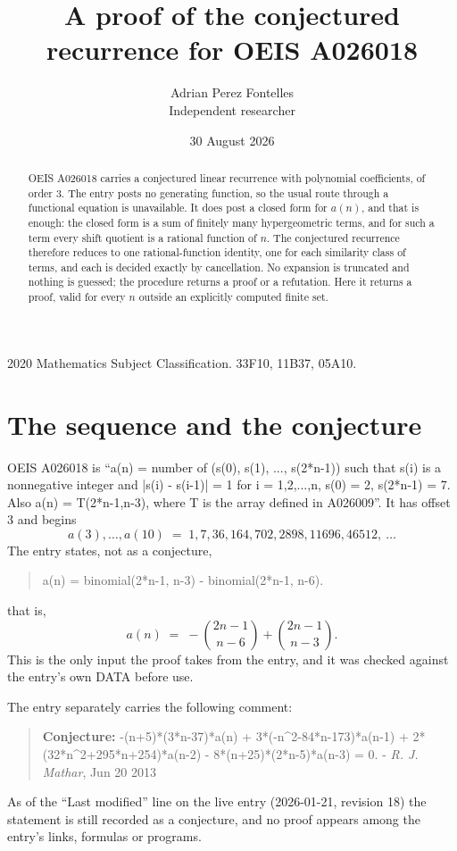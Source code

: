 \documentclass[11pt,a4paper]{article}
\title{A proof of the conjectured recurrence for OEIS A026018}
\author{Adrian Perez Fontelles\\ \small Independent researcher}
\date{30 August 2026}
\theoremstyle{plain}
\theoremstyle{definition}
\begin{document}
\maketitle

\begin{abstract}
OEIS A026018 carries a conjectured linear recurrence with polynomial coefficients, of
order 3. The entry posts no generating function, so the usual route through a
functional equation is unavailable. It does post a closed form for $a(n)$, and that is
enough: the closed form is a sum of finitely many hypergeometric terms, and for such a
term every shift quotient is a rational function of $n$. The conjectured recurrence
therefore reduces to one rational-function identity, one for each similarity
class of terms, and each is decided exactly by cancellation. No expansion is truncated and
nothing is guessed; the procedure returns a proof or a refutation. Here it returns a proof,
valid for every $n$ outside an explicitly computed finite set.
\end{abstract}

\noindent\small 2020 Mathematics Subject Classification. 33F10, 11B37, 05A10.\normalsize

\section{The sequence and the conjecture}

OEIS A026018 is ``a(n) = number of (s(0), s(1), ..., s(2*n-1)) such that s(i) is a nonnegative integer and |s(i) - s(i-1)| = 1 for i = 1,2,...,n, s(0) = 2, s(2*n-1) = 7. Also a(n) = T(2*n-1,n-3), where T is the array defined in A026009''. It has offset $3$ and begins
\[
a(3),\dots,a(10)\;=\;1, 7, 36, 164, 702, 2898, 11696, 46512,\ \dots
\]
The entry states, not as a conjecture,
\begin{quote}\small
a(n) = binomial(2*n-1, n-3) - binomial(2*n-1, n-6).
\end{quote}
that is,
\begin{equation}\label{eq:cf}
a(n)\;=\;- {\binom{2 n - 1}{n - 6}} + {\binom{2 n - 1}{n - 3}} .
\end{equation}
This is the only input the proof takes from the entry, and it was checked against the
entry's own DATA before use.

The entry separately carries the following comment:
\begin{quote}\small
\textbf{Conjecture:} -(n+5)*(3*n-37)*a(n) + 3*(-n\^{}2-84*n-173)*a(n-1) + 2*(32*n\^{}2+295*n+254)*a(n-2) - 8*(n+25)*(2*n-5)*a(n-3) = 0. - \emph{R. J. Mathar}, Jun 20 2013
\end{quote}
As of the ``Last modified'' line on the live entry (2026-01-21, revision 18) the
statement is still recorded as a conjecture, and no proof appears among the entry's links,
formulas or programs.
\end{document}
